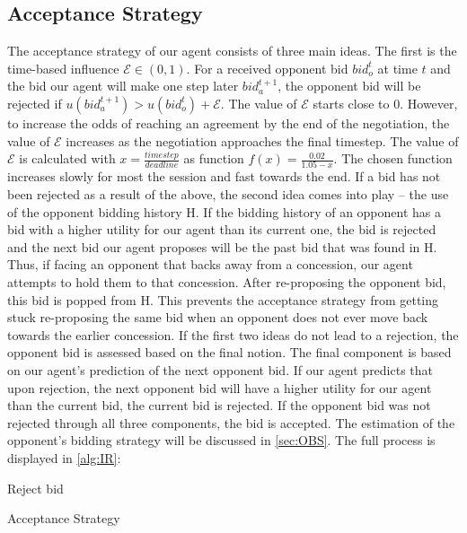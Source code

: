 \documentclass[a4paper,11pt]{article}
\theoremstyle{mytheor}
\begin{document}
\subsection{Acceptance Strategy}
The acceptance strategy of our agent consists of three main ideas. The first is the time-based influence $\mathcal{E} \in (0,1)$. For a received opponent bid $bid_o^t$ at time $t$ and the bid our agent will make one step later $bid_a^{t+1}$, the opponent bid will be rejected if $u(bid_a^{t+1}) > u(bid_o^t) + \mathcal{E}$. The value of $\mathcal{E}$ starts close to 0. However, to increase the odds of reaching an agreement by the end of the negotiation, the value of $\mathcal{E}$ increases as the negotiation approaches the final timestep. The value of $\mathcal{E}$ is calculated with $x=\frac{time step}{deadline}$ as function $f(x)=\frac{0.02}{1.05 - x}$. The chosen function increases slowly for most the session and fast towards the end. If a bid has not been rejected as a result of the above, the second idea comes into play – the use of the opponent bidding history H. If the bidding history of an opponent has a bid with a higher utility for our agent than its current one, the bid is rejected and the next bid our agent proposes will be the past bid that was found in H. Thus, if facing an opponent that backs away from a concession, our agent attempts to hold them to that concession. After re-proposing the opponent bid, this bid is popped from H. This prevents the acceptance strategy from getting stuck re-proposing the same bid when an opponent does not ever move back towards the earlier concession. If the first two ideas do not lead to a rejection, the opponent bid is assessed based on the final notion. The final component is based on our agent’s prediction of the next opponent bid. 
If our agent predicts that upon rejection, the next opponent bid will have a higher utility for our agent than the current bid, the current bid is rejected. If the opponent bid was not rejected through all three components, the bid is accepted. The estimation of the opponent's bidding strategy will be discussed in \autoref{sec:OBS}. The full process is displayed in \autoref{alg:IR}:\\

\begin{algorithm}[H]
\SetAlgoNoEnd\SetAlgoNoLine
{}%
{Reject bid}
\caption{Acceptance Strategy}\label{alg:IR}
\end{algorithm}
\end{document}
